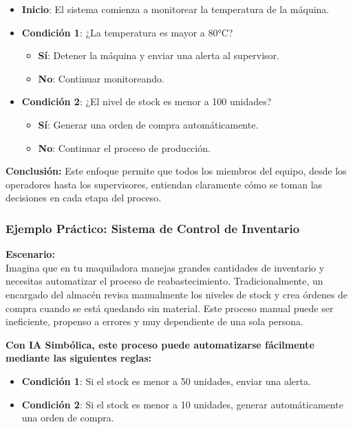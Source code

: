 \documentclass[
  10pt,
  letterpaper,
]{book}
\providecommand{\tightlist}{%
  \setlength{\itemsep}{0pt}\setlength{\parskip}{0pt}}\usepackage{longtable,booktabs,array}
\begin{document}
\begin{enumerate}
  \begin{itemize}
  \tightlist
  \item
    \textbf{Inicio}: El sistema comienza a monitorear la temperatura de
    la máquina.
  \item
    \textbf{Condición 1}: ¿La temperatura es mayor a 80°C?

    \begin{itemize}
    \tightlist
    \item
      \textbf{Sí}: Detener la máquina y enviar una alerta al supervisor.
    \item
      \textbf{No}: Continuar monitoreando.
    \end{itemize}
  \item
    \textbf{Condición 2}: ¿El nivel de stock es menor a 100 unidades?

    \begin{itemize}
    \tightlist
    \item
      \textbf{Sí}: Generar una orden de compra automáticamente.
    \item
      \textbf{No}: Continuar el proceso de producción.
    \end{itemize}
  \end{itemize}

  \textbf{Conclusión:} Este enfoque permite que todos los miembros del
  equipo, desde los operadores hasta los supervisores, entiendan
  claramente cómo se toman las decisiones en cada etapa del proceso.
\end{enumerate}

\subsubsection{Ejemplo Práctico: Sistema de Control de
Inventario}\label{ejemplo-pruxe1ctico-sistema-de-control-de-inventario}

\textbf{Escenario:}\\
Imagina que en tu maquiladora manejas grandes cantidades de inventario y
necesitas automatizar el proceso de reabastecimiento. Tradicionalmente,
un encargado del almacén revisa manualmente los niveles de stock y crea
órdenes de compra cuando se está quedando sin material. Este proceso
manual puede ser ineficiente, propenso a errores y muy dependiente de
una sola persona.

\textbf{Con IA Simbólica, este proceso puede automatizarse fácilmente
mediante las siguientes reglas:}

\begin{itemize}
\tightlist
\item
  \textbf{Condición 1}: Si el stock es menor a 50 unidades, enviar una
  alerta.
\item
  \textbf{Condición 2}: Si el stock es menor a 10 unidades, generar
  automáticamente una orden de compra.
\end{itemize}
\end{document}

